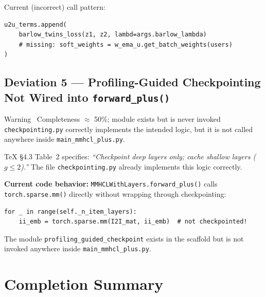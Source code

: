 \documentclass[11pt,a4paper]{article}
\begin{document}
Current (incorrect) call pattern:

\begin{lstlisting}[style=mypython, caption={Current (incorrect) u2u branch call}]
u2u_terms.append(
    barlow_twins_loss(z1, z2, lambd=args.barlow_lambda)
    # missing: soft_weights = w_ema_u.get_batch_weights(users)
)
\end{lstlisting}

\subsection{Deviation 5 --- Profiling-Guided Checkpointing Not Wired into \texttt{forward\_plus()}}

\begin{warnbox}{Warning \textemdash\ Completeness $\approx$ 50\%; module exists but is never invoked}
\texttt{checkpointing.py} correctly implements the intended logic, but it is
not called anywhere inside \texttt{main\_mmhcl\_plus.py}.
\end{warnbox}

\TeX{} \S4.3 Table~2 specifies: \emph{``Checkpoint deep layers only; cache shallow layers ($g \leq 2$).''}
The file \texttt{checkpointing.py} already implements this logic correctly.

\textbf{Current code behavior:} \texttt{MMHCLWithLayers.forward\_plus()} calls \texttt{torch.sparse.mm()} directly without wrapping through checkpointing:

\begin{lstlisting}[style=mypython, caption={Current (uncheckpointed) forward pass}]
for _ in range(self._n_item_layers):
    ii_emb = torch.sparse.mm(I2I_mat, ii_emb)  # not checkpointed!
\end{lstlisting}

The module \texttt{profiling\_guided\_checkpoint} exists in the scaffold but is not invoked anywhere inside \texttt{main\_mmhcl\_plus.py}.

\section{Completion Summary}
\end{document}
